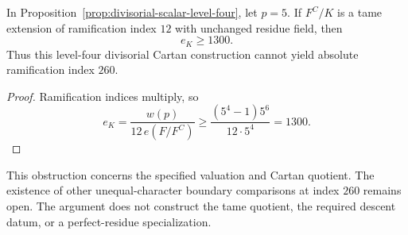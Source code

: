 \begin{corollary}\label{cor:divisorial-1300-bound}
In Proposition~\ref{prop:divisorial-scalar-level-four}, let $p=5$. If $F^C/K$ is a tame extension of ramification index $12$ with unchanged residue field, then
\[
 e_K\ge1300.
\]
Thus this level-four divisorial Cartan construction cannot yield absolute ramification index $260$.
\end{corollary}

\begin{proof}
Ramification indices multiply, so
\[
 e_K=\frac{w(p)}{12\,e(F/F^C)}
     \ge\frac{(5^4-1)5^6}{12\cdot5^4}
     =1300.
\]
\end{proof}

This obstruction concerns the specified valuation and Cartan quotient. The existence of other unequal-character boundary comparisons at index $260$ remains open. The argument does not construct the tame quotient, the required descent datum, or a perfect-residue specialization.
